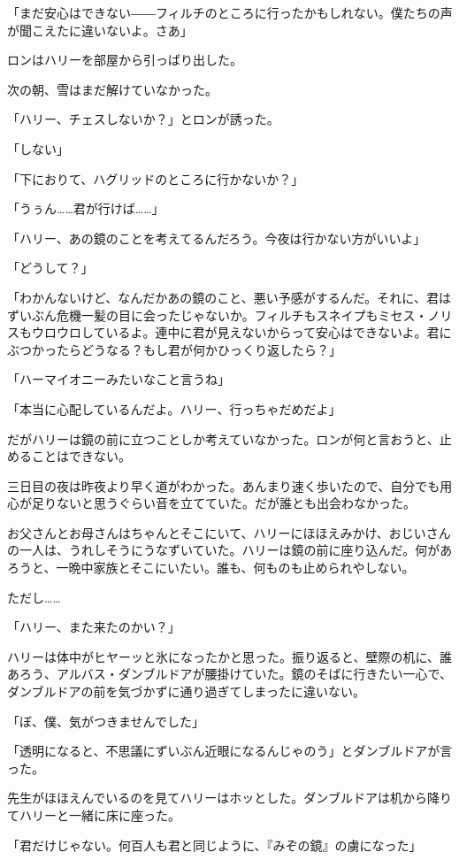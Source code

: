 \documentclass[10pt,a4paper]{article}
\begin{document}
\begin{CJK}{UTF8}{min}
「まだ安心はできない――フィルチのところに行ったかもしれない。僕たちの声が聞こえたに違いないよ。さあ」

ロンはハリーを部屋から引っばり出した。



次の朝、雪はまだ解けていなかった。

「ハリー、チェスしないか？」とロンが誘った。

「しない」

「下におりて、ハグリッドのところに行かないか？」

「うぅん……君が行けば……」

「ハリー、あの鏡のことを考えてるんだろう。今夜は行かない方がいいよ」

「どうして？」

「わかんないけど、なんだかあの鏡のこと、悪い予感がするんだ。それに、君はずいぶん危機一髪の目に会ったじゃないか。フィルチもスネイプもミセス・ノリスもウロウロしているよ。連中に君が見えないからって安心はできないよ。君にぶつかったらどうなる？もし君が何かひっくり返したら？」

「ハーマイオニーみたいなこと言うね」

「本当に心配しているんだよ。ハリー、行っちゃだめだよ」

だがハリーは鏡の前に立つことしか考えていなかった。ロンが何と言おうと、止めることはできない。



三日目の夜は昨夜より早く道がわかった。あんまり速く歩いたので、自分でも用心が足りないと思うぐらい音を立てていた。だが誰とも出会わなかった。

お父さんとお母さんはちゃんとそこにいて、ハリーにほほえみかけ、おじいさんの一人は、うれしそうにうなずいていた。ハリーは鏡の前に座り込んだ。何があろうと、一晩中家族とそこにいたい。誰も、何ものも止められやしない。

ただし……

「ハリー、また来たのかい？」

ハリーは体中がヒヤーッと氷になったかと思った。振り返ると、壁際の机に、誰あろう、アルバス・ダンブルドアが腰掛けていた。鏡のそばに行きたい一心で、ダンブルドアの前を気づかずに通り過ぎてしまったに違いない。

「ぼ、僕、気がつきませんでした」

「透明になると、不思議にずいぶん近眼になるんじゃのう」とダンブルドアが言った。

先生がほほえんでいるのを見てハリーはホッとした。ダンブルドアは机から降りてハリーと一緒に床に座った。

「君だけじゃない。何百人も君と同じように、『みぞの鏡』の虜になった」


\end{CJK}
\end{document}
